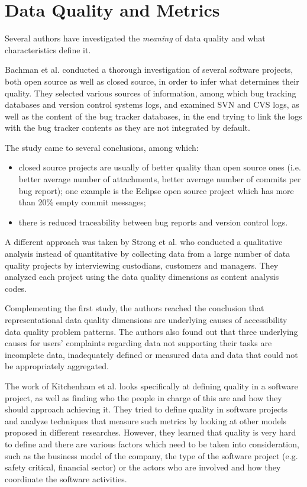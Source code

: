 \documentclass[11pt,english,twocolumn]{article}
\begin{document}
\section{Data Quality and Metrics}
\label{sec:data-quality}

Several authors have investigated the \emph{meaning} of data quality and
what characteristics define it.

Bachman et al.\cite{bachmann2009software} conducted a thorough investigation of several
software projects, both open source as well as closed source, in order 
to infer what determines their quality. They selected 
various sources of information, among which bug tracking 
databases and version control systems logs, and examined SVN and CVS logs,
as well as the content of the bug tracker databases, in the end trying to link 
the logs with the bug tracker contents as they are not integrated by default. 

The study came to several conclusions, among which:
  \begin{itemize}
    \item closed source projects are usually of better quality than open source ones
    (i.e. better average number of attachments, better average number of commits per bug report); 
    one example is the Eclipse open source project which has more than 20\% empty commit messages;
    \item there is reduced traceability between bug reports and version control logs.
  \end{itemize}

A different approach was taken by Strong et al.\cite{strong1997data} who conducted a qualitative analysis
instead of quantitative by collecting data from a large number of data quality projects by 
interviewing custodians, customers and managers. They analyzed each project
using the data quality dimensions as content analysis codes.

Complementing the first study, the authors reached the conclusion that representational data 
quality dimensions are underlying causes of accessibility data quality problem
patterns. The authors also found out that three underlying causes for users'
complaints regarding data not supporting their tasks are incomplete data, 
inadequately defined or measured data and data that could not be appropriately
aggregated.

The work of Kitchenham et al.\cite{kitchenham1996software} looks specifically at defining
quality in a software project, as well as finding who the people in charge of this 
are and how they should approach achieving it. They tried to define quality 
in software projects and analyze techniques that measure such metrics by looking
at other models proposed in different researches. However, they learned that quality is very hard to define and
there are various factors which need to be taken into consideration, such as the
business model of the company, the type of the software project (e.g. safety 
critical, financial sector) or the actors who are involved and how they coordinate
the software activities. 
\end{document}
